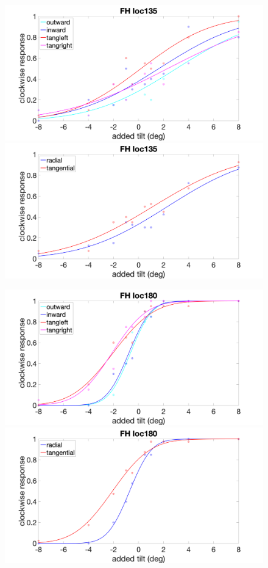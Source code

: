 \documentclass[11pt]{article} %
\begin{document}
\begin{figure}[H]
\centering %
\includegraphics[scale=.15]{Images/FH_PF_loc135_4conds.png}
\includegraphics[scale=.15]{Images/FH_PF_loc135_2conds.png}
\end{figure}
\begin{figure}[H]
\centering %
\includegraphics[scale=.15]{Images/FH_PF_loc180_4conds.png}
\includegraphics[scale=.15]{Images/FH_PF_loc180_2conds.png}
\end{figure}
\end{document}
